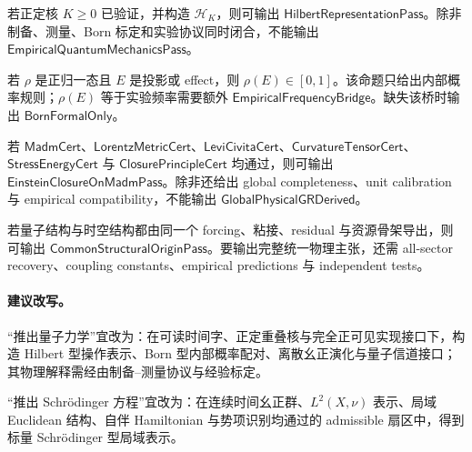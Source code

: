 \begin{theorem}\label{thm:typed-address-biaxial-completion-hilbert-representation-boundary}
若正定核 \(K\ge0\) 已验证，并构造 \(\mathcal H_K\)，则可输出 \(\mathsf{HilbertRepresentationPass}\)。除非制备、测量、Born 标定和实验协议同时闭合，不能输出 \(\mathsf{EmpiricalQuantumMechanicsPass}\)。
\end{theorem}

\begin{theorem}\label{thm:typed-address-biaxial-completion-born-pairing-boundary}
若 \(\rho\) 是正归一态且 \(E\) 是投影或 effect，则 \(\rho(E)\in[0,1]\)。该命题只给出内部概率规则；\(\rho(E)\) 等于实验频率需要额外 \(\mathsf{EmpiricalFrequencyBridge}\)。缺失该桥时输出 \(\mathsf{BornFormalOnly}\)。
\end{theorem}

\begin{theorem}\label{thm:typed-address-biaxial-completion-einstein-domain-boundary}
若 \(\mathsf{MadmCert}\)、\(\mathsf{LorentzMetricCert}\)、\(\mathsf{LeviCivitaCert}\)、\(\mathsf{CurvatureTensorCert}\)、\(\mathsf{StressEnergyCert}\) 与 \(\mathsf{ClosurePrincipleCert}\) 均通过，则可输出 \(\mathsf{EinsteinClosureOnMadmPass}\)。除非还给出 global completeness、unit calibration 与 empirical compatibility，不能输出 \(\mathsf{GlobalPhysicalGRDerived}\)。
\end{theorem}

\begin{theorem}[共同结构起源不等于统一物理]\label{thm:typed-address-biaxial-completion-common-origin-not-unified-physics}
若量子结构与时空结构都由同一个 forcing、粘接、residual 与资源骨架导出，则可输出 \(\mathsf{CommonStructuralOriginPass}\)。要输出完整统一物理主张，还需 all-sector recovery、coupling constants、empirical predictions 与 independent tests。
\end{theorem}

\paragraph{建议改写。}
“推出量子力学”宜改为：在可读时间字、正定重叠核与完全正可见实现接口下，构造 Hilbert 型操作表示、Born 型内部概率配对、离散幺正演化与量子信道接口；其物理解释需经由制备--测量协议与经验标定。

“推出 Schr\"odinger 方程”宜改为：在连续时间幺正群、\(L^2(X,\nu)\) 表示、局域 Euclidean 结构、自伴 Hamiltonian 与势项识别均通过的 admissible 扇区中，得到标量 Schr\"odinger 型局域表示。

